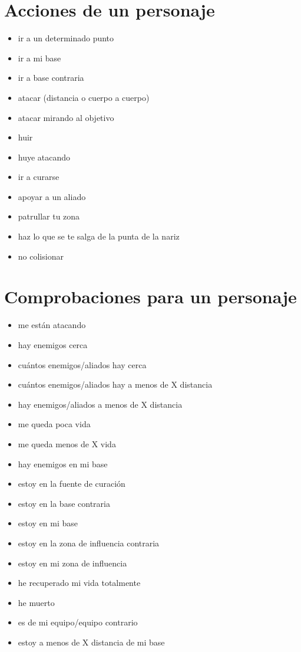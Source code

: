 \documentclass[a4paper,10pt]{article}
\begin{document}
\section{Acciones de un personaje}
\begin{itemize}
 \item ir a un determinado punto
 \item ir a mi base
 \item ir a base contraria
 \item atacar (distancia o cuerpo a cuerpo)
 \item atacar mirando al objetivo
 \item huir
 \item huye atacando
 \item ir a curarse
 \item apoyar a un aliado
 \item patrullar tu zona
 \item haz lo que se te salga de la punta de la nariz
 \item no colisionar
\end{itemize}


\section{Comprobaciones para un personaje}
\begin{itemize}
 \item me están atacando
 \item hay enemigos cerca
 \item cuántos enemigos/aliados hay cerca
 \item cuántos enemigos/aliados hay a menos de X distancia
 \item hay enemigos/aliados a menos de X distancia
 \item me queda poca vida
 \item me queda menos de X vida
 \item hay enemigos en mi base
 \item estoy en la fuente de curación
 \item estoy en la base contraria
 \item estoy en mi base
 \item estoy en la zona de influencia contraria
 \item estoy en mi zona de influencia
 \item he recuperado mi vida totalmente
 \item he muerto
 \item es de mi equipo/equipo contrario
 \item estoy a menos de X distancia de mi base
\end{itemize}
\end{document}
